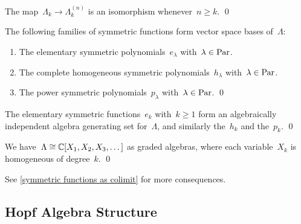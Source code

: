 \documentclass[a4paper,11pt]{scrartcl}
\begin{document}
\begin{corollary}
  \label{iso in each degree for sufficiently large}
  The map~$\Lambda_k \to \Lambda^{(n)}_k$ is an isomorphism whenever~$n \geq k$.
  \qed
\end{corollary}

\begin{corollary}
  \label{bases for symmetric functions}
  The following families of symmetric functions form vector space bases of~$\Lambda$:
  \begin{enumerate}
    \item
      The elementary symmetric polynomials~$e_\lambda$ with~$\lambda \in \mathrm{Par}$.
    \item
      The complete homogeneous symmetric polynomials~$h_\lambda$ with~$\lambda \in \mathrm{Par}$.
    \item
      The power symmetric polynomials~$p_\lambda$ with~$\lambda \in \mathrm{Par}$.
    \qed
  \end{enumerate}
\end{corollary}

\begin{corollary}
  The elementary symmetric functions~$e_k$ with~$k \geq 1$ form an algebraically independent algebra generating set for~$\Lambda$, and similarly the~$h_k$ and the~$p_k$.
  \qed
\end{corollary}

\begin{corollary}
  We have~$\Lambda \cong \mathbb{C}[X_1, X_2, X_3, \dotsc]$ as graded algebras, where each variable~$X_k$ is homogeneous of degree~$k$.
  \qed
\end{corollary}

See \cref{symmetric functions as colimit} for more consequences.



\subsection{Hopf Algebra Structure}
\end{document}
